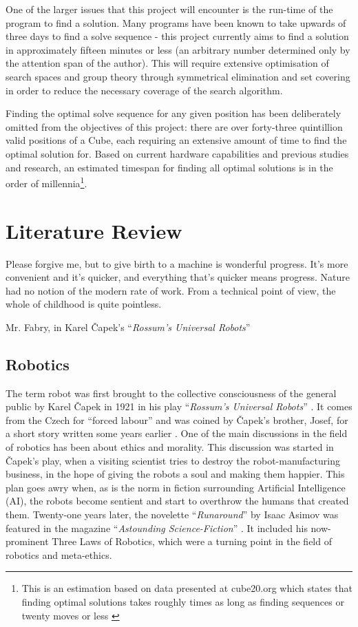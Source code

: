 \documentclass{report}
\newcommand{\tit}[1]{\textit{#1}}
\newcommand{\propernoun}[1]{\enquote{\tit{#1}}}
\begin{document}
    One of the larger issues that this project will encounter is the run-time of the program to find a solution. Many programs have been known to take upwards of three days to find a solve sequence - this project currently aims to find a solution in approximately fifteen minutes or less (an arbitrary number determined only by the attention span of the author). This will require extensive optimisation of search spaces and group theory through symmetrical elimination and set covering in order to reduce the necessary coverage of the search algorithm.
    
    Finding the optimal solve sequence for any given position has been deliberately omitted from the objectives of this project: there are over forty-three quintillion valid positions of a Cube, each requiring an extensive amount of time to find the optimal solution for. Based on current hardware capabilities and previous studies and research, an estimated timespan for finding all optimal solutions is in the order of millennia\footnote{This is an estimation based on data presented at cube20.org which states that finding optimal solutions takes roughly  times as long as finding sequences or twenty moves or less \cite{Rokicki2010}}.
    
    \newpage
    \chapter{Literature Review}
    \epigraph{Please forgive me, but to give birth to a machine is wonderful progress. It's more convenient and it's quicker, and everything that's quicker means progress. Nature had no notion of the modern rate of work. From a technical point of view, the whole of childhood is quite pointless.}{Mr. Fabry, in Karel \v{C}apek's \propernoun{Rossum's Universal Robots}\cite{Capek1921}}
    
    \section{Robotics}
    The term robot was first brought to the collective consciousness of the general public by Karel \v{C}apek in 1921 in his play \propernoun{Rossum's Universal Robots} \cite{Capek1921}. It comes from the Czech for \enquote{forced labour} and was coined by \v{C}apek's brother, Josef, for a short story written some years earlier \cite{Etymonline2017}. One of the main discussions in the field of robotics has been about ethics and morality. This discussion was started in \v{C}apek's play, when a visiting scientist tries to destroy the robot-manufacturing business, in the hope of giving the robots a soul and making them happier. This plan goes awry when, as is the norm in fiction surrounding Artificial Intelligence (AI), the robots become sentient and start to overthrow the humans that created them. Twenty-one years later, the novelette \propernoun{Runaround} by Isaac Asimov was featured in the magazine \propernoun{Astounding Science-Fiction} \cite{Asimov1942}. It included his now-prominent Three Laws of Robotics, which were a turning point in the field of robotics and meta-ethics.
    
\end{document}

